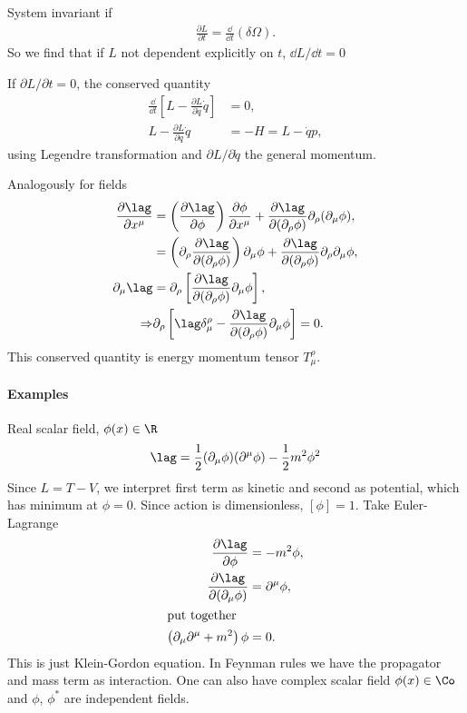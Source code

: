 System invariant if
\begin{align}
   \frac{\partial L}{\partial t} = \frac{\dd}{\dd{t} } (\delta \Omega).
\end{align}
So we find that if $L$ not dependent explicitly on $t$, $\dd{L} / \dd{t} = 0$

If $\partial L / \partial t = 0$, the conserved quantity
\begin{align*}
   \frac{\dd}{\dd{t}} \left[ L - \frac{\partial L}{\partial \dot{q}} \dot{q} \right] &= 0, \\
   L - \frac{\partial L}{\partial \dot{q}} \dot{q} &= -H = L - \dot{q} p,
\end{align*}
using Legendre transformation and $\partial L / \partial \dot{q}$ the general momentum.

Analogously for fields
\begin{align*}
   \frac{\partial \lag}{\partial x^\mu} &= \left(\frac{\partial \lag}{\partial \phi} \right) \frac{\partial \phi}{\partial x^\mu} + \frac{\partial \lag}{ \partial (\partial_\rho \phi)} \partial_\rho (\partial_\mu \phi), \\
                                        &= \left(\partial_\rho \frac{\partial \lag}{\partial(\partial_\rho \phi)} \right) \partial_\mu \phi + \frac{\partial \lag}{ \partial (\partial_\rho \phi)} \partial_\rho \partial_\mu \phi, \\
                     \partial_\mu \lag &= \partial_\rho \left[ \frac{\partial \lag}{\partial(\partial_\rho \phi)} \partial_\mu \phi \right],  \\
                     \Rightarrow &\partial_\rho \left[ \lag \delta_{\mu}^{\rho} - \frac{\partial \lag}{\partial (\partial_\rho \phi)} \partial_\mu \phi \right] = 0.
\end{align*}
This conserved quantity is energy momentum tensor $T_{\mu}^{\rho}$.

\paragraph{Examples}
Real scalar field, $\phi(x) \in \R$
\begin{align}
   \lag = \frac{1}{2} (\partial_\mu \phi) (\partial^\mu \phi) - \frac{1}{2} m^2 \phi^2
\end{align}
Since $L = T - V$, we interpret first term as kinetic and second as potential, which has minimum at $\phi=0$.
Since action is dimensionless, $[\phi] = 1$. Take Euler-Lagrange 
\begin{align*}
   \frac{\partial \lag}{\partial \phi} &= - m^2 \phi, \\
   \frac{\partial \lag}{\partial (\partial_\mu \phi)} &= \partial^\mu \phi, \\
   \shortintertext{put together}
   \left( \partial_\mu \partial^\mu + m^2 \right)\phi &= 0.
\end{align*}
This is just Klein-Gordon equation. In Feynman rules we have the propagator and mass term as interaction.
One can also have complex scalar field $\phi(x) \in \Co$ and $\phi$, $\phi^*$ are independent fields.

